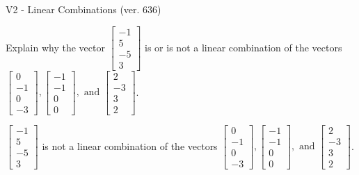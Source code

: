 \begin{exercise}
  \begin{exerciseTitle}V2 - Linear Combinations (ver. 636)\end{exerciseTitle}
  \begin{exerciseStatement}
    Explain why the vector \(\left[\begin{array}{c}
-1 \\
5 \\
-5 \\
3
\end{array}\right]\)  is or is not a linear 
	combination of the vectors \(\left[\begin{array}{c}
0 \\
-1 \\
0 \\
-3
\end{array}\right] , \left[\begin{array}{c}
-1 \\
-1 \\
0 \\
0
\end{array}\right] , \text{ and } \left[\begin{array}{c}
2 \\
-3 \\
3 \\
2
\end{array}\right]\).
	


  \end{exerciseStatement}
  \begin{exerciseAnswer}
   \(\left[\begin{array}{c}
-1 \\
5 \\
-5 \\
3
\end{array}\right]\) 
  	 is not  
	a linear combination of the vectors \(\left[\begin{array}{c}
0 \\
-1 \\
0 \\
-3
\end{array}\right] , \left[\begin{array}{c}
-1 \\
-1 \\
0 \\
0
\end{array}\right] , \text{ and } \left[\begin{array}{c}
2 \\
-3 \\
3 \\
2
\end{array}\right]\).

	
  


  \end{exerciseAnswer}
\end{exercise}